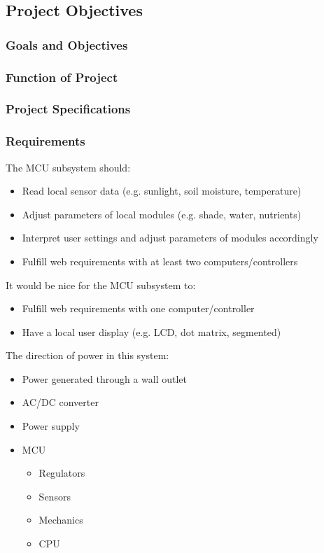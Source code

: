 \subsection{Project Objectives}
\subsubsection*{Goals and Objectives}
\subsubsection*{Function of Project}
\subsubsection{Project Specifications}
\subsubsection*{Requirements}
The MCU subsystem should:
\begin{itemize}
    \item Read local sensor data (e.g. sunlight, soil moisture, temperature)
    \item Adjust parameters of local modules (e.g. shade, water, nutrients)
    \item Interpret user settings and adjust parameters of modules accordingly
    \item Fulfill web requirements with at least two computers/controllers
\end{itemize}
It would be nice for the MCU subsystem to:
\begin{itemize}
    \item Fulfill web requirements with one computer/controller
    \item Have a local user display (e.g. LCD, dot matrix, segmented)
\end{itemize}
The direction of power in this system:
\begin{itemize}
  \item Power generated through a wall outlet
  \item AC/DC converter 
  \item Power supply
  \item MCU
  \begin{itemize}
    \item Regulators
    \item Sensors
    \item Mechanics
    \item CPU
  \end{itemize}
\end{itemize}
